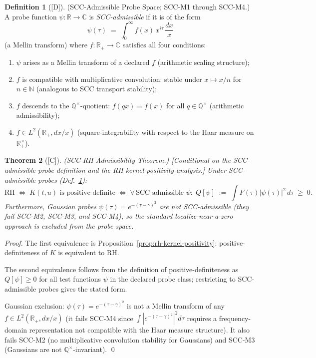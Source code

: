 \documentclass[12pt,oneside]{amsbook}
\theoremstyle{plain}
\newtheorem{theorem}{Theorem}[section]
\theoremstyle{definition}
\newtheorem{definition}[theorem]{Definition}
\theoremstyle{remark}
\newcommand{\status}[1]{\textup{[#1]}}
\begin{document}
\begin{definition}[\status{D}]\label{def:scc-admissible-probes}
\textup{(SCC-Admissible Probe Space; SCC-M1 through SCC-M4.)}
A probe function $\psi : \mathbb{R} \to \mathbb{C}$ is
\emph{SCC-admissible} if it is of the form
\[
 \psi(\tau) \;=\; \int_0^\infty f(x)\, x^{i\tau}\, \frac{dx}{x}
\]
(a Mellin transform) where $f : \mathbb{R}_+ \to \mathbb{C}$
satisfies all four conditions:
\begin{enumerate}[label=\textup{(SCC-M\arabic*)}]
 \item $\psi$ arises as a Mellin transform of a declared $f$
 (arithmetic scaling structure);
 \item $f$ is compatible with multiplicative convolution:
 stable under $x \mapsto x/n$ for $n \in \mathbb{N}$
 (analogous to SCC transport stability);
 \item $f$ descends to the $\mathbb{Q}^\times$-quotient:
 $f(qx) = f(x)$ for all $q \in \mathbb{Q}^\times$
 (arithmetic admissibility);
 \item $f \in L^2(\mathbb{R}_+, dx/x)$ (square-integrability
 with respect to the Haar measure on $\mathbb{R}_+^\times$).
\end{enumerate}
\end{definition}

\begin{theorem}[\status{C}]\label{thm:scc-rh-equivalence}
\textup{(SCC-RH Admissibility Theorem.)}
\textup{[Conditional on the SCC-admissible probe definition and the
RH kernel positivity analysis.]}
Under SCC-admissible probes (Def.~\ref{def:scc-admissible-probes}):
\[
 \mathrm{RH}
 \;\Longleftrightarrow\;
 K(t,u) \text{ is positive-definite}
 \;\Longleftrightarrow\;
 \forall\,\text{SCC-admissible } \psi:\;
 Q[\psi] \;:=\; \int F(\tau)|\psi(\tau)|^2\,d\tau \;\geq\; 0.
\]
Furthermore, Gaussian probes $\psi(\tau) = e^{-(\tau-\gamma)^2}$
are \emph{not} SCC-admissible (they fail SCC-M2, SCC-M3, and
SCC-M4), so the standard localize-near-a-zero approach is
excluded from the probe space.
\end{theorem}

\begin{proof}
The first equivalence is Proposition~\ref{prop:rh-kernel-positivity}:
positive-definiteness of $K$ is equivalent to RH.

The second equivalence follows from the definition of
positive-definiteness as $Q[\psi] \geq 0$ for all test functions
$\psi$ in the declared probe class; restricting to
SCC-admissible probes gives the stated form.

Gaussian exclusion: $\psi(\tau) = e^{-(\tau-\gamma)^2}$ is not
a Mellin transform of any $f \in L^2(\mathbb{R}_+, dx/x)$ (it
fails SCC-M4 since $\int |e^{-(\tau-\gamma)^2}|^2 d\tau$ requires
a frequency-domain representation not compatible with the Haar
measure structure). It also fails SCC-M2 (no multiplicative
convolution stability for Gaussians) and SCC-M3 (Gaussians are
not $\mathbb{Q}^\times$-invariant). \qed
\end{proof}
\end{document}
